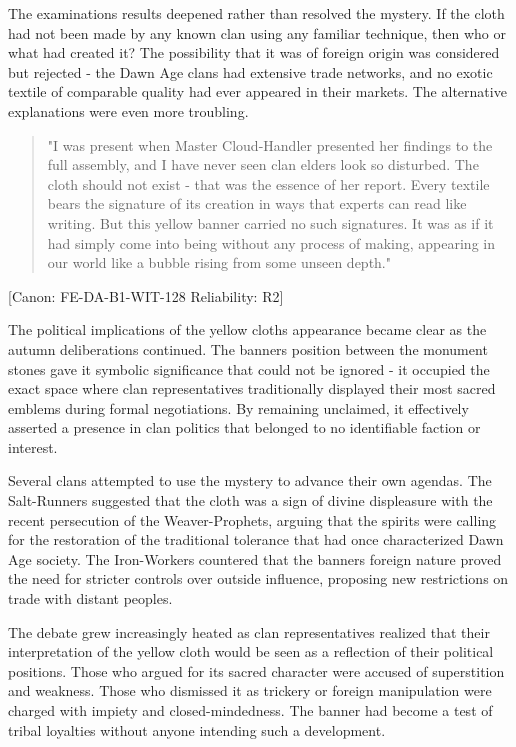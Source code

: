 The examination\textquotesingle s results deepened rather than resolved
the mystery. If the cloth had not been made by any known clan using any
familiar technique, then who or what had created it? The possibility
that it was of foreign origin was considered but rejected - the Dawn Age
clans had extensive trade networks, and no exotic textile of comparable
quality had ever appeared in their markets. The alternative explanations
were even more troubling.

\begin{quote}
"I was present when Master Cloud-Handler presented her findings to the
full assembly, and I have never seen clan elders look so disturbed. The
cloth should not exist - that was the essence of her report. Every
textile bears the signature of its creation in ways that experts can
read like writing. But this yellow banner carried no such signatures. It
was as if it had simply come into being without any process of making,
appearing in our world like a bubble rising from some unseen depth."
\end{quote}

{[}Canon: FE-DA-B1-WIT-128 \textbar{} Reliability: R2{]}

The political implications of the yellow cloth\textquotesingle s
appearance became clear as the autumn deliberations continued. The
banner\textquotesingle s position between the monument stones gave it
symbolic significance that could not be ignored - it occupied the exact
space where clan representatives traditionally displayed their most
sacred emblems during formal negotiations. By remaining unclaimed, it
effectively asserted a presence in clan politics that belonged to no
identifiable faction or interest.

Several clans attempted to use the mystery to advance their own agendas.
The Salt-Runners suggested that the cloth was a sign of divine
displeasure with the recent persecution of the Weaver-Prophets, arguing
that the spirits were calling for the restoration of the traditional
tolerance that had once characterized Dawn Age society. The Iron-Workers
countered that the banner\textquotesingle s foreign nature proved the
need for stricter controls over outside influence, proposing new
restrictions on trade with distant peoples.

The debate grew increasingly heated as clan representatives realized
that their interpretation of the yellow cloth would be seen as a
reflection of their political positions. Those who argued for its sacred
character were accused of superstition and weakness. Those who dismissed
it as trickery or foreign manipulation were charged with impiety and
closed-mindedness. The banner had become a test of tribal loyalties
without anyone intending such a development.

